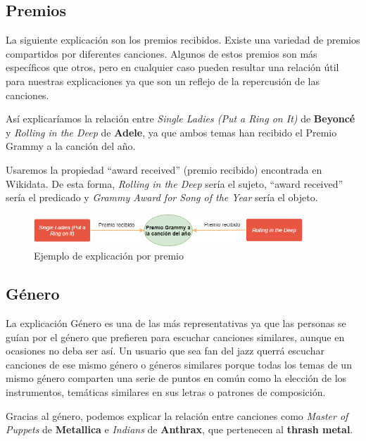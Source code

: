 \subsection*{Premios}

La siguiente explicación son los premios recibidos. Existe una variedad de premios compartidos por diferentes canciones. Algunos de estos premios son más específicos que otros, pero en cualquier caso pueden resultar una relación útil para nuestras explicaciones ya que son un reflejo de la repercusión de las canciones.

Así explicaríamos la relación entre \textit{Single Ladies (Put a Ring on It)} de \textbf{Beyoncé} y \textit{Rolling in the Deep} de \textbf{Adele}, ya que ambos temas han recibido el Premio Grammy a la canción del año.

Usaremos la propiedad ``award received'' (premio recibido) encontrada en Wikidata. De esta forma, \textit{Rolling in the Deep} sería el sujeto, ``award received'' sería el predicado y \textit{Grammy Award for Song of the Year} sería el objeto.\\

\begin{figure}[h!]
	\centering
	\includegraphics[width = 0.9\textwidth]{Imagenes/Bitmap/Premio ejemplo.png}
	\caption{Ejemplo de explicación por premio}
	\label{fig:sampleImage}
\end{figure}

\subsection*{Género}

La explicación Género es una de las más representativas ya que las personas se guían por el género que prefieren para escuchar canciones similares, aunque en ocasiones no deba ser así. Un usuario que sea fan del jazz querrá escuchar canciones de ese mismo género o géneros similares porque todas los temas de un mismo género comparten una serie de puntos en común como la elección de los instrumentos, temáticas similares en sus letras o patrones de composición.

Gracias al género, podemos explicar la relación entre canciones como \textit{Master of Puppets} de \textbf{Metallica} e \textit{Indians} de \textbf{Anthrax}, que pertenecen al \textbf{thrash metal}.

